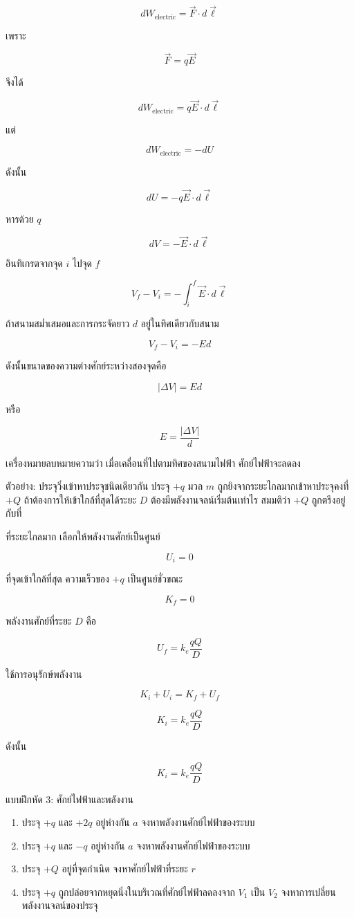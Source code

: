 \[
dW_{\text{electric}}=\vec{F}\cdot d\vec{\ell}
\]

เพราะ

\[
\vec{F}=q\vec{E}
\]

จึงได้

\[
dW_{\text{electric}}=q\vec{E}\cdot d\vec{\ell}
\]

แต่

\[
dW_{\text{electric}}=-dU
\]

ดังนั้น

\[
dU=-q\vec{E}\cdot d\vec{\ell}
\]

หารด้วย $q$

\[
dV=-\vec{E}\cdot d\vec{\ell}
\]

อินทิเกรตจากจุด $i$ ไปจุด $f$

\[
\boxed{
V_f-V_i
=
-\int_i^f \vec{E}\cdot d\vec{\ell}}
\]

ถ้าสนามสม่ำเสมอและการกระจัดยาว $d$ อยู่ในทิศเดียวกับสนาม

\[
V_f-V_i=-Ed
\]

ดังนั้นขนาดของความต่างศักย์ระหว่างสองจุดคือ

\[
\boxed{|\Delta V|=Ed}
\]

หรือ

\[
\boxed{E=\frac{|\Delta V|}{d}}
\]

เครื่องหมายลบหมายความว่า เมื่อเคลื่อนที่ไปตามทิศของสนามไฟฟ้า ศักย์ไฟฟ้าจะลดลง

\begin{examplebox}{ตัวอย่าง: ประจุวิ่งเข้าหาประจุชนิดเดียวกัน}
ประจุ $+q$ มวล $m$ ถูกยิงจากระยะไกลมากเข้าหาประจุคงที่ $+Q$ ถ้าต้องการให้เข้าใกล้ที่สุดได้ระยะ $D$ ต้องมีพลังงานจลน์เริ่มต้นเท่าไร สมมติว่า $+Q$ ถูกตรึงอยู่กับที่

ที่ระยะไกลมาก เลือกให้พลังงานศักย์เป็นศูนย์

\[
U_i=0
\]

ที่จุดเข้าใกล้ที่สุด ความเร็วของ $+q$ เป็นศูนย์ชั่วขณะ

\[
K_f=0
\]

พลังงานศักย์ที่ระยะ $D$ คือ

\[
U_f=k_e\frac{qQ}{D}
\]

ใช้การอนุรักษ์พลังงาน

\[
K_i+U_i=K_f+U_f
\]

\[
K_i= k_e\frac{qQ}{D}
\]

ดังนั้น

\[
\boxed{K_i=k_e\frac{qQ}{D}}
\]
\end{examplebox}

\begin{exercisebox}{แบบฝึกหัด 3: ศักย์ไฟฟ้าและพลังงาน}
\begin{enumerate}
    \item ประจุ $+q$ และ $+2q$ อยู่ห่างกัน $a$ จงหาพลังงานศักย์ไฟฟ้าของระบบ
    \item ประจุ $+q$ และ $-q$ อยู่ห่างกัน $a$ จงหาพลังงานศักย์ไฟฟ้าของระบบ
    \item ประจุ $+Q$ อยู่ที่จุดกำเนิด จงหาศักย์ไฟฟ้าที่ระยะ $r$
    \item ประจุ $+q$ ถูกปล่อยจากหยุดนิ่งในบริเวณที่ศักย์ไฟฟ้าลดลงจาก $V_1$ เป็น $V_2$ จงหาการเปลี่ยนพลังงานจลน์ของประจุ
\end{enumerate}
\end{exercisebox}

